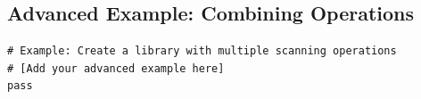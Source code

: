 \documentclass[11pt]{article}
\begin{document}
\subsection{Advanced Example: Combining Operations}
\label{subsec:advanced-example}


\begin{verbatim}
# Example: Create a library with multiple scanning operations
# [Add your advanced example here]
pass
\end{verbatim}




\end{document}
